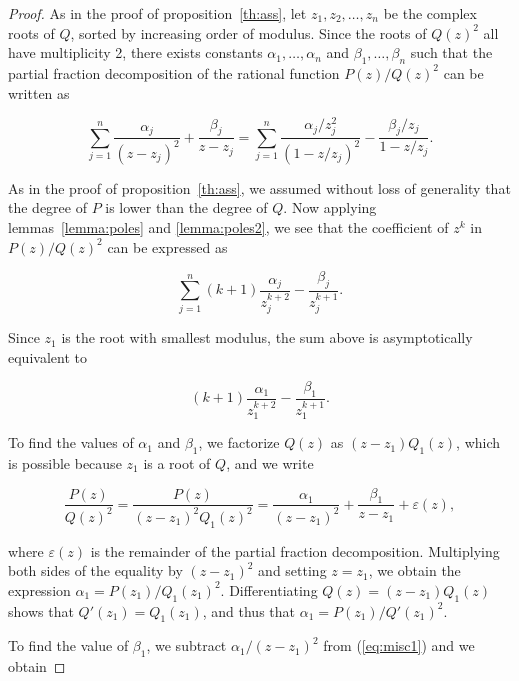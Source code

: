 \documentclass{article}
\begin{document}
\begin{proof}
As in the proof of proposition~\ref{th:ass}, let $z_1, z_2, \ldots, z_n$
be the complex roots of $Q$, sorted by increasing order of modulus. Since
the roots of $Q(z)^2$ all have multiplicity 2, there exists constants
$\alpha_1, \ldots, \alpha_n$ and $\beta_1, \ldots, \beta_n$ such that the
partial fraction decomposition of the rational function $P(z)/Q(z)^2$ can
be written as

\begin{equation*}
\sum_{j=1}^n \frac{\alpha_j}{(z-z_j)^2} + \frac{\beta_j}{z-z_j} =
\sum_{j=1}^n \frac{\alpha_j/z_j^2}{(1-z/z_j)^2}
-\frac{\beta_j/z_j}{1-z/z_j}.
\end{equation*}

As in the proof of proposition~\ref{th:ass}, we assumed without loss of
generality that the degree of $P$ is lower than the degree of $Q$. Now
applying lemmas~\ref{lemma:poles} and \ref{lemma:poles2}, we see that
the coefficient of $z^k$ in $P(z)/Q(z)^2$ can be expressed as

\begin{equation}
\label{eq:fullass2}
\sum_{j=1}^n (k+1)\frac{\alpha_j}{z_j^{k+2}}-\frac{\beta_j}{z_j^{k+1}}.
\end{equation}

Since $z_1$ is the root with smallest modulus, the sum above is
asymptotically equivalent to

\begin{equation*}
(k+1)\frac{\alpha_1}{z_1^{k+2}}-\frac{\beta_1}{z_1^{k+1}}.
\end{equation*}

To find the values of $\alpha_1$ and $\beta_1$, we factorize $Q(z)$ as
$(z-z_1)Q_1(z)$, which is possible because $z_1$ is a root of $Q$,
and we write

\begin{equation}
\label{eq:misc1}
\frac{P(z)}{Q(z)^2} =
\frac{P(z)}{(z-z_1)^2Q_1(z)^2} = \frac{\alpha_1}{(z-z_1)^2} +
\frac{\beta_1}{z-z_1} + \varepsilon(z),
\end{equation}

\noindent
where $\varepsilon(z)$ is the remainder of the partial fraction
decomposition. Multiplying both sides of the equality by $(z-z_1)^2$ and
setting $z = z_1$, we obtain the expression $\alpha_1 =
P(z_1)/Q_1(z_1)^2$.  Differentiating $Q(z) = (z-z_1)Q_1(z)$ shows that
$Q'(z_1) = Q_1(z_1)$, and thus that $\alpha_1 = P(z_1) / Q'(z_1)^2$.

To find the value of $\beta_1$, we subtract $\alpha_1/(z-z_1)^2$ from
(\ref{eq:misc1}) and we obtain


\end{proof}
\end{document}
